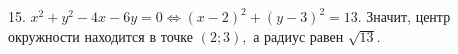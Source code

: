 15. $x^2+y^2-4x-6y=0\Leftrightarrow (x-2)^2+(y-3)^2=13.$ Значит, центр окружности находится в точке $(2;3),$ а радиус равен $\sqrt{13}.$\\
